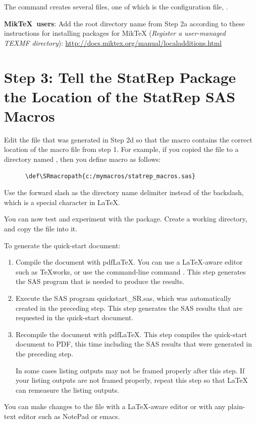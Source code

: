 \documentclass[article,oneside]{memoir}
\begin{document}
\begin{enumerate}[a)]
   The command creates several files, one of which is the configuration
   file, .

   \textbf{Mik\TeX\ users}:
   Add the root directory name from Step 2a according to these instructions
   for installing packages for MikTeX
   (\textit{Register a user-managed TEXMF directory}):
   \url{http://docs.miktex.org/manual/localadditions.html}

\end{enumerate}

\section{Step 3: Tell the StatRep Package the Location of the StatRep SAS Macros}

   Edit the  file that was generated in Step 2d so that the macro
    contains
   the correct location of the macro file from step 1. For example, if
   you copied the  file to a directory named
   ,
   then you define macro  as follows:
   \begin{verbatim}
      \def\SRmacropath{c:/mymacros/statrep_macros.sas}
   \end{verbatim}

   Use the forward slash
   as the directory name delimiter instead of the backslash, which is a special
   character in LaTeX.

   You can now test and experiment with the package. Create a working
   directory, and copy the file  into it.

   To generate the quick-start document:
\begin{enumerate}
\item Compile the document with pdf\LaTeX. You can use a \LaTeX-aware
      editor such as \TeX works, or use the command-line command .
      This step generates the SAS program that is needed to produce the results.

\item Execute the SAS program quickstart\_SR.sas, which was automatically
      created in the preceding step. This step generates the SAS
      results that are requested in the quick-start document.


\item Recompile the document with pdf\LaTeX. This step compiles the
      quick-start document to PDF, this time including the SAS results
      that were generated in the preceding step.

      In some cases listing outputs may not be framed properly after this step.
      If your listing outputs are not framed properly, repeat this step so that
      LaTeX can remeasure the listing outputs.

\end{enumerate}
   You can make changes to the file with a \LaTeX-aware editor
   or with any plain-text editor such as \textsf{NotePad} or \textsf{emacs}.
\end{document}
